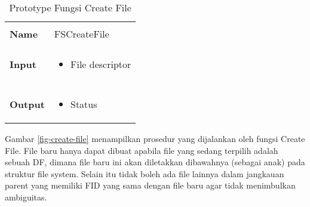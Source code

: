 \documentclass[a4paper, 12pt]{report}
\begin{document}
\begin{table}[htbp]
  \centering
  \begin{tabular}{p{2cm} p{8cm}}
    \hline\\
    {\bf Name} & FSCreateFile\\
    \hline\\
    {\bf Input} & 
    \begin{itemize}[noitemsep,topsep=0pt,parsep=0pt,partopsep=0pt]
    \item File descriptor
    \end{itemize}
    \\
    \hline\\
    {\bf Output} & 
    \begin{itemize}[noitemsep,topsep=0pt,parsep=0pt,partopsep=0pt]
    \item Status
    \end{itemize}
    \\
    \hline
  \end{tabular}
  \caption{Prototype Fungsi Create File}
  \label{tbl-create-file}
\end{table}


Gambar \ref{fig-create-file} menampilkan prosedur yang dijalankan oleh fungsi Create File. File baru hanya dapat dibuat apabila file yang sedang terpilih adalah sebuah DF, dimana file baru ini akan diletakkan dibawahnya (sebagai anak) pada struktur file system. Selain itu tidak boleh ada file lainnya dalam jangkauan parent yang memiliki FID yang sama dengan file baru agar tidak menimbulkan ambiguitas.
\end{document}
